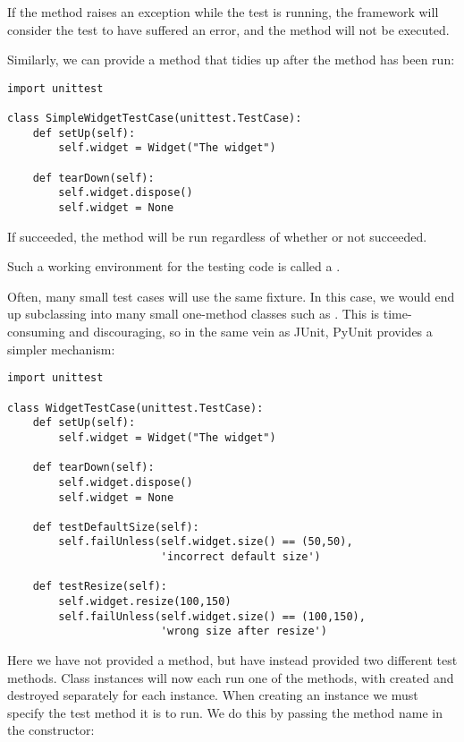 If the  method raises an exception while the test is
running, the framework will consider the test to have suffered an
error, and the  method will not be executed.

Similarly, we can provide a  method that tidies up
after the  method has been run:

\begin{verbatim}
import unittest

class SimpleWidgetTestCase(unittest.TestCase):
    def setUp(self):
        self.widget = Widget("The widget")

    def tearDown(self):
        self.widget.dispose()
        self.widget = None
\end{verbatim}

If  succeeded, the  method will be
run regardless of whether or not  succeeded.

Such a working environment for the testing code is called a
.

Often, many small test cases will use the same fixture.  In this case,
we would end up subclassing  into many
small one-method classes such as
.  This is time-consuming and
discouraging, so in the same vein as JUnit, PyUnit provides a simpler
mechanism:

\begin{verbatim}
import unittest

class WidgetTestCase(unittest.TestCase):
    def setUp(self):
        self.widget = Widget("The widget")

    def tearDown(self):
        self.widget.dispose()
        self.widget = None

    def testDefaultSize(self):
        self.failUnless(self.widget.size() == (50,50),
                        'incorrect default size')

    def testResize(self):
        self.widget.resize(100,150)
        self.failUnless(self.widget.size() == (100,150),
                        'wrong size after resize')
\end{verbatim}

Here we have not provided a  method, but have
instead provided two different test methods.  Class instances will now
each run one of the   methods, with 
created and destroyed separately for each instance.  When creating an
instance we must specify the test method it is to run.  We do this by
passing the method name in the constructor:

